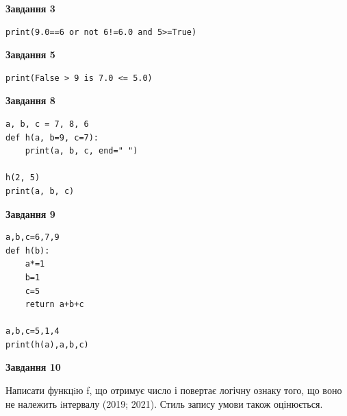 \documentclass[12pt, ukrainian]{article}
\begin{document}
{\begin {large}
\begin{minipage}[t]{7.5cm}
\end{minipage}
\vline \hspace{6mm}
\begin{minipage}[t]{10.5cm}

\begin{center}
\textbf{Завдання 3}
\end{center}

\begin{verbatim}
print(9.0==6 or not 6!=6.0 and 5>=True)
\end{verbatim}



\begin{center}
\textbf{Завдання 5}
\end{center}

\begin{verbatim}
print(False > 9 is 7.0 <= 5.0)
\end{verbatim}



\begin{center}
\textbf{Завдання 8}
\end{center}

\begin{verbatim}
a, b, c = 7, 8, 6
def h(a, b=9, c=7):
    print(a, b, c, end=" ")

h(2, 5)
print(a, b, c)
\end{verbatim}



\begin{center}
\textbf{Завдання 9}
\end{center}

\begin{verbatim}
a,b,c=6,7,9
def h(b):
    a*=1
    b=1
    c=5
    return a+b+c

a,b,c=5,1,4
print(h(a),a,b,c)
\end{verbatim}



\begin{center}
\textbf{Завдання 10}
\end{center}

Написати функцiю f, що отримує число і повертає логічну ознаку того, що воно не належить iнтервалу (2019; 2021). Стиль запису умови також оцінюється.\par

\end{minipage}

\end {large}}
\newpage
\end{document}
